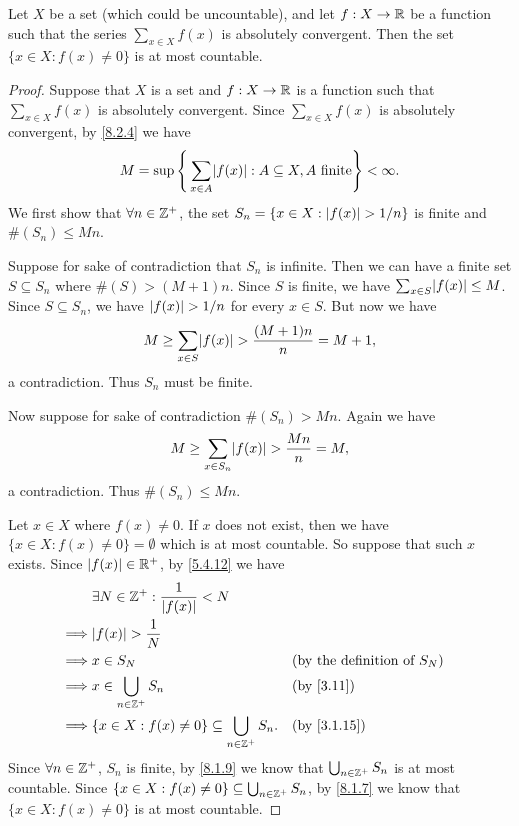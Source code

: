 \begin{lem}\label{8.2.5}
  Let \(X\) be a set (which could be uncountable), and let \(f : X \to \mathbb{R}\) be a function such that the series \(\sum_{x \in X} f(x)\) is absolutely convergent.
  Then the set \(\{x \in X : f(x) \neq 0\}\) is at most countable.
\end{lem}

\begin{proof}
  Suppose that \(X\) is a set and \(f : X \to \mathbb{R}\) is a function such that \(\sum_{x \in X} f(x)\) is absolutely convergent.
  Since \(\sum_{x \in X} f(x)\) is absolutely convergent, by \cref{8.2.4} we have
  \[
    M = \sup\Bigg\{\sum_{x \in A} \abs{f(x)} : A \subseteq X, A \text{ finite}\Bigg\} < \infty.
  \]
  We first show that \(\forall n \in \mathbb{Z}^+\), the set \(S_n = \{x \in X : \left\lvert f(x)\right\rvert > 1 / n\}\) is finite and \(\#(S_n) \leq Mn\).

  Suppose for sake of contradiction that \(S_n\) is infinite.
  Then we can have a finite set \(S \subseteq S_n\) where \(\#(S) > (M + 1)n\).
  Since \(S\) is finite, we have \(\sum_{x \in S} \abs{f(x)} \leq M\).
  Since \(S \subseteq S_n\), we have \(\left\lvert f(x)\right\rvert > 1 / n\) for every \(x \in S\).
  But now we have
  \[
    M \geq \sum_{x \in S} \abs{f(x)} > \dfrac{(M + 1)n}{n} = M + 1,
  \]
  a contradiction.
  Thus \(S_n\) must be finite.

  Now suppose for sake of contradiction \(\#(S_n) > Mn\).
  Again we have
  \[
    M \geq \sum_{x \in S_n} \abs{f(x)} > \dfrac{Mn}{n} = M,
  \]
  a contradiction.
  Thus \(\#(S_n) \leq Mn\).

  Let \(x \in X\) where \(f(x) \neq 0\).
  If \(x\) does not exist, then we have \(\{x \in X : f(x) \neq 0\} = \emptyset\) which is at most countable.
  So suppose that such \(x\) exists.
  Since \(\left\lvert f(x)\right\rvert \in \mathbb{R}^+\), by \cref{5.4.12} we have
  \begin{align*}
             & \exists N \in \Z^+ : \dfrac{1}{\abs{f(x)}} < N                                                           \\
    \implies & \abs{f(x)} > \dfrac{1}{N}                                                                                \\
    \implies & x \in S_N                                                     &  & \text{(by the definition of \(S_N\))} \\
    \implies & x \in \bigcup_{n \in \Z^+} S_n                                &  & \text{(by \cref{3.11})}               \\
    \implies & \{x \in X : f(x) \neq 0\} \subseteq \bigcup_{n \in \Z^+} S_n. &  & \by{3.1.15}
  \end{align*}
  Since \(\forall n \in \mathbb{Z}^+\), \(S_n\) is finite, by \cref{8.1.9} we know that \(\bigcup_{n \in \mathbb{Z}^+} S_n\) is at most countable.
  Since \(\{x \in X : f(x) \neq 0\} \subseteq \bigcup_{n \in \mathbb{Z}^+} S_n\), by \cref{8.1.7} we know that \(\{x \in X : f(x) \neq 0\}\) is at most countable.
\end{proof}

